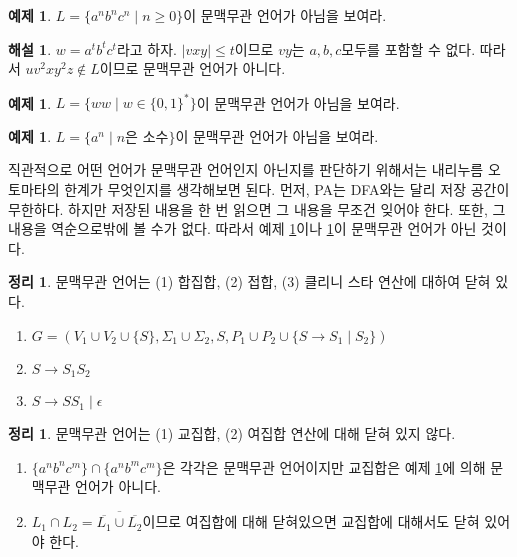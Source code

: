 \documentclass[b5paper, 11pt]{book}
\theoremstyle{definition}
\newtheorem{thm}[defn]{정리}
\newtheorem{ex}[defn]{예제}
\newtheorem*{ans*}{해설}
\newenvironment{pf*}{\pushQED{\qed}\pf}
{\popQED\endpf}
\begin{document}
\begin{ex}\label{anbncn}
    $L = \{a^n b^n c^n \;\vert\; n \ge 0 \}$이 문맥무관 언어가 아님을 보여라. 
\end{ex}
\begin{ans*}
    $w = a^t b^t c^t$라고 하자. $\vert vxy \vert \le t$이므로 $vy$는 $a,b,c$모두를 포함할 수 없다. 따라서 $uv^2 x y^2 z \notin L$이므로 문맥무관 언어가 아니다. 
\end{ans*}
\begin{ex}\label{ww}
    $L = \{ww \;\vert\; w \in \{0,1\}^*\}$이 문맥무관 언어가 아님을 보여라. 
\end{ex}
\begin{ex}
    $L = \{a^n \;\vert\; n \text{은 소수}\}$이 문맥무관 언어가 아님을 보여라.
\end{ex}
직관적으로 어떤 언어가 문맥무관 언어인지 아닌지를 판단하기 위해서는 내리누름 오토마타의 한계가 무엇인지를 생각해보면 된다. 먼저, PA는 DFA와는 달리 저장 공간이 무한하다. 하지만 저장된 내용을 한 번 읽으면 그 내용을 무조건 잊어야 한다. 또한, 그 내용을 역순으로밖에 볼 수가 없다. 따라서 예제 \ref{anbncn}이나 \ref{ww}이 문맥무관 언어가 아닌 것이다.
\begin{thm}
    문맥무관 언어는 (1) 합집합, (2) 접합, (3) 클리니 스타 연산에 대하여 닫혀 있다.
\end{thm}
\begin{pf*}
    \begin{enumerate}
        \item $G = (V_1 \cup V_2 \cup \{S\}, \Sigma_1 \cup \Sigma_2, S, P_1 \cup P_2 \cup \{S \rightarrow S_1 \;\vert\; S_2\})$
        \item $S \rightarrow S_1S_2$
        \item $S \rightarrow SS_1 \;\vert\; \epsilon$
    \end{enumerate}
\end{pf*}
\begin{thm}
    문맥무관 언어는 (1) 교집합, (2) 여집합 연산에 대해 닫혀 있지 않다. 
\end{thm}
\begin{pf*}
    \begin{enumerate}
        \item $\{a^n b^n c^m\} \cap \{a^n b^m c^m\}$은 각각은 문맥무관 언어이지만 교집합은 예제 \ref{anbncn}에 의해 문맥무관 언어가 아니다. \item $L_1 \cap L_2 = \overline{\overline{L_1} \cup \overline{L_2}}$이므로 여집합에 대해 닫혀있으면 교집합에 대해서도 닫혀 있어야 한다. 
    \end{enumerate}
\end{pf*}
\end{document}
